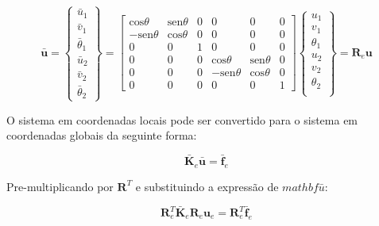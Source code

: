         \begin{equation}
            \mathbf{\bar{u}} = 
            \begin{Bmatrix}
                \bar{u}_1\\
                \bar{v}_1\\
                \bar{\theta}_1\\
                \bar{u}_2\\
                \bar{v}_2\\
                \bar{\theta}_2
            \end{Bmatrix}
            =
            \begin{bmatrix}
                \text{cos} \theta & \text{sen} \theta & 0 & 0 & 0 & 0\\
                -\text{sen} \theta & \text{cos} \theta & 0 & 0 & 0 & 0\\
                0 & 0 & 1 & 0 & 0 & 0\\
                0 & 0 & 0 & \text{cos} \theta & \text{sen} \theta & 0\\
                0 & 0 & 0 & -\text{sen} \theta & \text{cos} \theta & 0\\
                0 & 0 & 0 & 0 & 0 & 1
            \end{bmatrix}
            \begin{Bmatrix}
                u_1\\
                v_1\\
                \theta_1\\
                u_2\\
                v_2\\
                \theta_2\\
            \end{Bmatrix}=
            \mathbf{R}_e \mathbf{u}
        \end{equation}

        O sistema em coordenadas locais pode ser convertido para o sistema em coordenadas globais da seguinte forma:

        \begin{equation*}
            \mathbf{\bar{K}}_e \mathbf{\bar{u}} = \mathbf{\bar{f}}_e
        \end{equation*}

        Pre-multiplicando por $\mathbf{R}^T$ e substituindo a expressão de $mathbf{\bar{u}}$:

        \begin{equation*}
            \mathbf{R}_e^T \mathbf{\bar{K}}_e \mathbf{R}_e \mathbf{u}_e = \mathbf{R}_e^T \mathbf{\bar{f}}_e
        \end{equation*}
        
